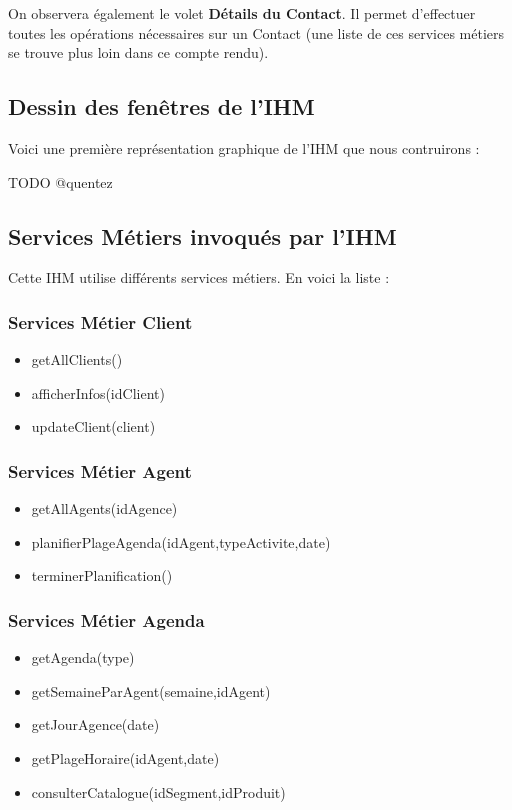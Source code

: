 On observera également le volet \textbf{Détails du Contact}. Il permet d'effectuer toutes les
opérations nécessaires sur un Contact (une liste de ces services métiers se trouve plus loin
dans ce compte rendu).

\subsection{Dessin des fenêtres de l'IHM}

Voici une première représentation graphique de l'IHM que nous contruirons :

TODO @quentez

\subsection{Services Métiers invoqués par l'IHM}

Cette IHM utilise différents services métiers. En voici la liste :

\subsubsection{Services Métier Client}

\begin{itemize}
\item getAllClients()
\item afficherInfos(idClient)
\item updateClient(client)
\end{itemize}

\subsubsection{Services Métier Agent}

\begin{itemize}
\item getAllAgents(idAgence)
\item planifierPlageAgenda(idAgent,typeActivite,date)
\item terminerPlanification()
\end{itemize}

\subsubsection{Services Métier Agenda}

\begin{itemize}
\item getAgenda(type)
\item getSemaineParAgent(semaine,idAgent)
\item getJourAgence(date)
\item getPlageHoraire(idAgent,date)
\item consulterCatalogue(idSegment,idProduit)
\end{itemize}


